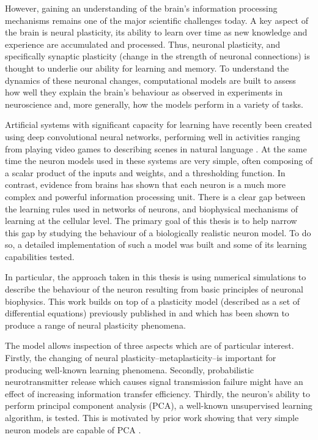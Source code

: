 \documentclass[a4paper,12pt]{report}
\theoremstyle{definition}
\begin{document}
However, gaining an understanding of the brain's information processing mechanisms remains one of the major scientific challenges today. A key aspect of the brain is neural plasticity, its ability to learn over time as new knowledge and experience are accumulated and processed. Thus, neuronal plasticity, and specifically synaptic plasticity (change in the strength of neuronal connections) is thought to underlie our ability for learning and memory. To understand the dynamics of these neuronal changes, computational models are built to assess how well they explain the brain's behaviour as observed in experiments in neuroscience and, more generally, how the models perform in a variety of tasks.

Artificial systems with significant capacity for learning have recently been created using deep convolutional neural networks, performing well in activities ranging from playing video games \cite{mnih2015human} to describing scenes in natural language \cite{karpathy2014deep}. At the same time the neuron models used in these systems are very simple, often composing of a scalar product of the inputs and weights, and a thresholding function. In contrast, evidence from brains has shown that each neuron is a much more complex and powerful information processing unit. There is a clear gap between the learning rules used in networks of neurons, and biophysical mechanisms of learning at the cellular level. The primary goal of this thesis is to help narrow this gap by studying the behaviour of a biologically realistic neuron model. To do so, a detailed implementation of such a model was built and some of its learning capabilities tested. 

In particular, the approach taken in this thesis is using numerical simulations to describe the behaviour of the neuron resulting from basic principles of neuronal biophysics. This work builds on top of a plasticity model (described as a set of differential equations) previously published in \cite{yeung2004synaptic} and which has been shown to produce a range of neural plasticity phenomena. 

The model allows inspection of three aspects which are of particular interest. Firstly, the changing of neural plasticity--metaplasticity--is important for producing well-known learning phenomena. Secondly, probabilistic neurotransmitter release which causes signal transmission failure might have an effect of increasing information transfer efficiency. Thirdly, the neuron's ability to perform principal component analysis (PCA), a well-known unsupervised learning algorithm, is tested. This is motivated by prior work showing that very simple neuron models are capable of PCA \cite{oja2008oja}.
\end{document}
